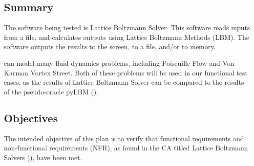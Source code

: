 \documentclass[12pt, titlepage]{article}
\newcommand{\famname}{Lattice Boltzmann Solver}
\begin{document}

\subsection{Summary}

The software being tested is \famname. This software reads inputs from a file,
and calculates outputs using Lattice Boltzmann Methods (LBM). The software
outputs the results to the screen, to a file, and/or to memory.

\noindent {\famname} can model many fluid dynamics problems, including
Poiseuille Flow and Von Karman Vortex Street. Both of these problems will be
used in our functional test cases, as the results of {\famname} can be compared
to the results of the pseudo-oracle pyLBM (\citet{pylbmcode}).

\subsection{Objectives} \label{objectives}

The intended objective of this plan is to verify that functional requirements
and non-functional requirements (NFR), as found in the CA titled Lattice
Boltzmann Solvers (\citet{LBM_CA_PM}), have been met. 
\end{document}

